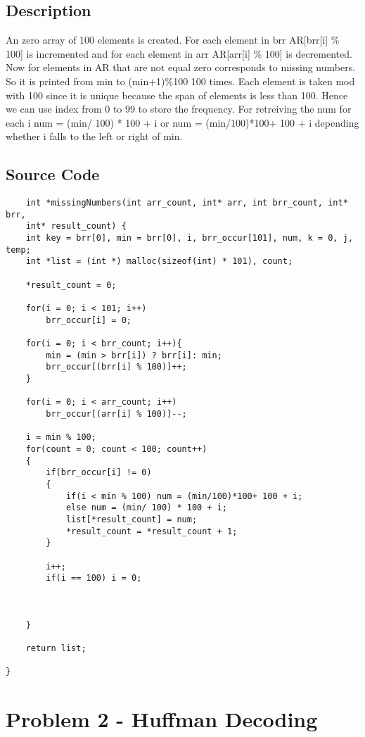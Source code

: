 \documentclass{article}
\begin{document}
\subsection{Description}
An zero array of 100 elements is created. For each element in brr AR[brr[i] \% 100] is incremented and for each element in arr AR[arr[i] \% 100] is decremented. Now for elements in AR that are not equal zero corresponds to missing numbers. So it is printed from min to (min+1)\%100 100 times. Each element is taken mod with 100 since it is unique because the span of elements is less than 100. Hence we can use index from 0 to 99 to store the frequency. For retreiving the num for each i num =  (min/ 100) * 100 + i or num = (min/100)*100+ 100 + i depending whether i falls to the left or right of min.

\subsection{Source Code}
\begin{verbatim}
    int *missingNumbers(int arr_count, int* arr, int brr_count, int* brr, 
    int* result_count) {
    int key = brr[0], min = brr[0], i, brr_occur[101], num, k = 0, j, temp;
    int *list = (int *) malloc(sizeof(int) * 101), count;
    
    *result_count = 0;
    
    for(i = 0; i < 101; i++)
        brr_occur[i] = 0;
    
    for(i = 0; i < brr_count; i++){
        min = (min > brr[i]) ? brr[i]: min;
        brr_occur[(brr[i] % 100)]++;
    }
    
    for(i = 0; i < arr_count; i++)
        brr_occur[(arr[i] % 100)]--;
    
    i = min % 100;
    for(count = 0; count < 100; count++)
    {
        if(brr_occur[i] != 0)
        {
            if(i < min % 100) num = (min/100)*100+ 100 + i;
            else num = (min/ 100) * 100 + i;
            list[*result_count] = num;
            *result_count = *result_count + 1;
        }
        
        i++;
        if(i == 100) i = 0;
        
        

    }
    
    return list;
    
}

\end{verbatim}
\newpage
\section{Problem 2 - Huffman Decoding}
\end{document}
